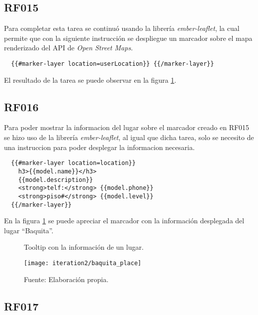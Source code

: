 \subsection{RF015}
\label{sub:RF015}

Para completar esta tarea se continuó usando la librería \emph{ember-leaflet}, la cual permite que con la siguiente instrucción se despliegue un marcador sobre el mapa renderizado del API de \emph{Open Street Maps}.

\begin{verbatim}
  {{#marker-layer location=userLocation}} {{/marker-layer}}
\end{verbatim}

El resultado de la tarea se puede observar en la figura \ref{fig:baquita_place}.

\subsection{RF016}
\label{sub:RF016}

Para poder mostrar la informacion del lugar sobre el marcador creado en RF015 se hizo uso de la librería \emph{ember-leaflet}, al igual que dicha tarea, solo se necesito de una instruccion para poder desplegar la informacion necesaria.

\begin{verbatim}
  {{#marker-layer location=location}}
    h3>{{model.name}}</h3>
    {{model.description}}
    <strong>telf:</strong> {{model.phone}}
    <strong>piso#</strong> {{model.level}}
  {{/marker-layer}}
\end{verbatim}

En la figura \ref{fig:baquita_place} se puede apreciar el marcador con la información desplegada del lugar ``Baquita''.

\begin{figure}[H]
  \begin{center}
    \caption{Tooltip con la información de un lugar.}
    \label{fig:baquita_place}
    \texttt{[image: iteration2/baquita\_place]}
    \caption*{Fuente: Elaboración propia.}
  \end{center}
\end{figure}


\subsection{RF017}
\label{sub:RF017}

